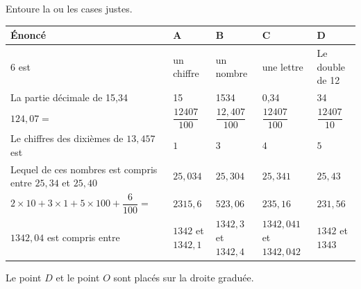\begin{pageAuto} 

\ExoAuto

Entoure la ou les cases justes.


\begin{tabularx}{\linewidth}{|p{6cm}|X|X|X|X|}
\hline 
Énoncé & A & B & C & D \\ 
\hline 
$6$ est  & un chiffre &  un nombre & une lettre & Le double de 12 \\ 
\hline 
La partie décimale de 15,34 & 15 & 1534 & 0,34 & 34 \\ 
\hline
$124,07=$ & $\dfrac{12407}{100}$ &  $\dfrac{12,407}{100}$ &  $\dfrac{12407}{100}$ &  $\dfrac{12407}{10}$  \\ 
\hline 
Le chiffres des dixièmes de $13,457$ est  & $1$ & $3$ & $4$ & $5$ \\ 
\hline 
Lequel de ces nombres est compris entre $25,34$ et $25,40 $ & $25,034$ & $25,304$ & $25,341$ & $25,43$ \\ 
\hline 
 $2\times 10 +3\times 1+5\times 100 +\dfrac{6}{100}=$ & $2315,6$ &  $523,06$ &  $235,16$ &  $231,56$ \vspace{0.3cm} \\ 
\hline 
 $1342,04$ est compris entre & $1342$ et $1342,1$ &  $1342,3$ et  $1342,4$ & $1342,041$  et  $1342,042$&  $1342$ et $1343$ \\ 
\hline
\end{tabularx} 

\ExoAuto


 Le point $D$ et le point $O$ sont placés sur la droite graduée.
 



\end{pageAuto}
